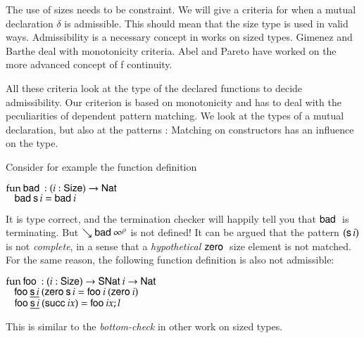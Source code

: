 The use of sizes needs to be constraint.
We will give a criteria for when a mutual declaration $\delta$ is admissible.
This should mean that the size type is used in valid ways.
Admissibility is a necessary concept in works on sized types.
Gimenez and Barthe deal with monotonicity criteria.
Abel and Pareto have worked on the more advanced concept of f continuity.

All these criteria look at the type of the declared functions to decide admissibility.
Our criterion is based on monotonicity and has to deal with the peculiarities of
dependent pattern matching. We look at the types of a mutual declaration, but 
also at the patterns : Matching on constructors has an influence on the type.  

Consider for example the function definition
\begin{bsp}
$\mathrm{fun}\: \mathsf{bad}\: : ( i : \mathsf{Size} ) \rightarrow{\mathsf{Nat}\:}$\\
$\hspace*{3mm} \mathsf{bad}\: \mathsf{s}\, i = \mathsf{bad}\: i $ 
\end{bsp}
It is type correct, and the termination checker will happily tell you that $\mathsf{bad}\:$ is terminating.
But $\searrow \mathsf{bad}\: \infty^{\rho}$ is not defined!
It can be argued that the pattern $(\mathsf{s}\, i)$ is not \emph{complete}, in a sense that 
a \emph{hypothetical} $\mathsf{zero}\:$ size element is not matched. 
For the same reason, the following function definition is also not admissible:
\begin{bsp}
$\mathrm{fun}\: \mathsf{foo}\: : ( i : \mathsf{Size} ) \rightarrow{\mathsf{SNat}\:i \rightarrow\mathsf{Nat}\:}$\\
$\hspace*{3mm} \mathsf{foo}\: \underline{\mathsf{s}\, i} \: (\mathsf{zero}\: \mathsf{s}\, i = \mathsf{foo}\: i \: (\mathsf{zero}\: i)$\\
$\hspace*{3mm} \mathsf{foo}\: \underline{\mathsf{s}\, i}\: (\mathsf{succ}\: i x) = \mathsf{foo}\: i x; l$
\end{bsp}
This is similar to the \emph{bottom-check} in other work on sized types.

